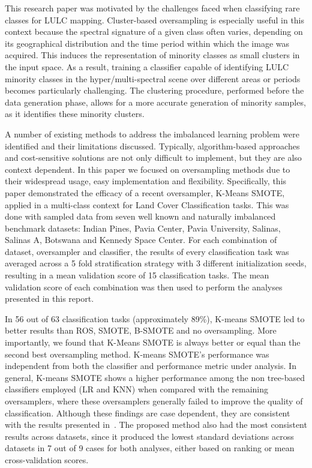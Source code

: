 This research paper was motivated by the challenges faced when classifying
rare classes for LULC mapping. Cluster-based oversampling is especially useful
in this context because the spectral signature of a given class often varies,
depending on its geographical distribution and the time period within which
the image was acquired. This induces the representation of minority classes as
small clusters in the input space. As a result, training a classifier capable
of identifying LULC minority classes in the hyper/multi-spectral scene over
different areas or periods becomes particularly challenging. The clustering
procedure, performed before the data generation phase, allows for a more
accurate generation of minority samples, as it identifies these minority
clusters.

A number of existing methods to address the imbalanced learning problem were
identified and their limitations discussed. Typically, algorithm-based
approaches and cost-sensitive solutions are not only difficult to implement,
but they are also context dependent. In this paper we focused on oversampling
methods due to their widespread usage, easy implementation and flexibility.
Specifically, this paper demonstrated the efficacy of a recent oversampler,
K-Means SMOTE, applied in a multi-class context for Land Cover Classification
tasks. This was done with sampled data from seven well known and naturally
imbalanced benchmark datasets: Indian Pines, Pavia Center, Pavia University,
Salinas, Salinas A, Botswana and Kennedy Space Center. For each combination of
dataset, oversampler and classifier, the results of every classification task
was averaged across a 5 fold stratification strategy with 3 different
initialization seeds, resulting in a mean validation score of 15
classification tasks. The mean validation score of each combination was then
used to perform the analyses presented in this report.

In 56 out of 63 classification tasks (approximately 89\%), K-means SMOTE led
to better results than ROS, SMOTE, B-SMOTE and no oversampling. More
importantly, we found that K-Means SMOTE is always better or equal than the
second best oversampling method.  K-means SMOTE's performance was independent
from both the classifier and performance metric under analysis. In general,
K-means SMOTE shows a higher performance among the non tree-based classifiers
employed (LR and KNN) when compared with the remaining oversamplers, where
these oversamplers generally failed to improve the quality of classification.
Although these findings are case dependent, they are consistent with the
results presented in~\cite{Douzas2018}. The proposed method also had the most
consistent results across datasets, since it produced the lowest standard
deviations across datasets in 7 out of 9 cases for both analyses, either based
on ranking or mean cross-validation scores.


